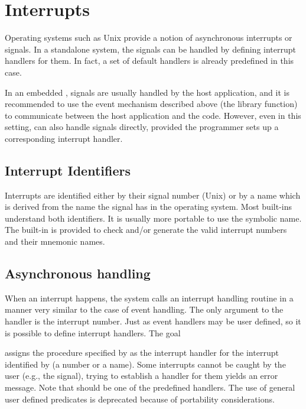 \section{Interrupts\label{sectinterrupts}}

Operating systems such as Unix provide a notion of asynchronous interrupts
or signals. In a standalone {\eclipse} system, the signals can be handled by
defining interrupt handlers for them. In fact, a set of
default handlers is already predefined in this case.

In an embedded {\eclipse}, signals are usually handled by the host
application, and it is recommended to use the event mechanism described above
(the  library function) to communicate between the
host
application and the {\eclipse} code.
However, even in this setting, {\eclipse} can also handle signals directly,
provided the programmer sets up a corresponding interrupt handler.

\vfill %

\subsection{Interrupt Identifiers}
Interrupts are identified either by their signal number (Unix) or
by a name which is derived from the name the signal has in the operating
system. Most built-ins understand both identifiers. It is usually
more portable to use the symbolic name.
The built-in
 is
provided to check and/or
generate the valid interrupt numbers and their mnemonic names.


\subsection{Asynchronous handling}

When an interrupt happens, the {\eclipse} system
calls an interrupt handling routine in a manner very similar to
the case of event handling. The only argument to the handler is
the interrupt number.
Just as event handlers may be user defined, so it is possible to define
interrupt handlers. The goal
\begin{quote}
%
\end{quote}
assigns the procedure specified by  as the interrupt handler for
the interrupt identified by  (a number or a name).
Some interrupts cannot be caught by the user (e.g., the  signal),
trying to establish a handler for them yields an error message. Note that
 should be one of the predefined handlers. The use of general
user defined predicates is deprecated because of portability considerations.

